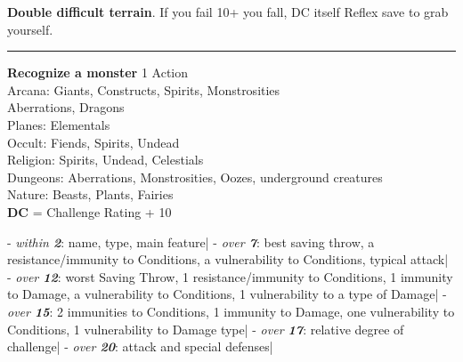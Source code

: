 \documentclass[a4paper,12 pt,openany]{book}
\newcommand{\linex}{\rule{\textwidth}{0.4pt}}
\begin{document}
\begin{textblock*}{7.4cm}
\textbf{Double difficult terrain}. If you fail 10+ you fall, DC itself Reflex save to grab yourself.

\linex

\textbf{Recognize a monster} 1 Action\\
Arcana: Giants, Constructs, Spirits, Monstrosities\\
Aberrations, Dragons\\
Planes: Elementals\\
Occult: Fiends, Spirits, Undead\\
Religion: Spirits, Undead, Celestials\\
Dungeons: Aberrations, Monstrosities, Oozes, underground creatures\\
Nature: Beasts, Plants, Fairies\\
\textbf{DC} = Challenge Rating + 10

- \textit{within \textbf{2}}: name, type, main feature|
- \textit{over \textbf{7}}: best saving throw, a resistance/immunity to Conditions, a vulnerability to Conditions, typical attack|
- \textit{over \textbf{12}}: worst Saving Throw, 1 resistance/immunity to Conditions, 1 immunity to Damage, a vulnerability to Conditions, 1 vulnerability to a type of Damage|
- \textit{over \textbf{15}}: 2 immunities to Conditions, 1 immunity to Damage, one vulnerability to Conditions, 1 vulnerability to Damage type|
- \textit{over \textbf{17}}: relative degree of challenge|
- \textit{over \textbf{20}}: attack and special defenses|

\end{textblock*}
\end{document}
